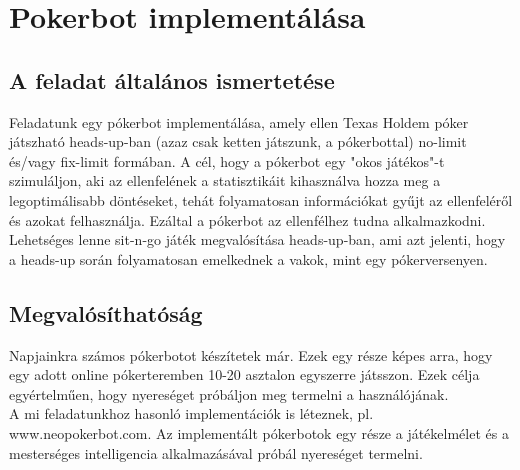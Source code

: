 \documentclass[a4paper]{article}
\begin{document}
\section*{Pokerbot implementálása}
\subsection*{A feladat általános ismertetése}
Feladatunk egy pókerbot implementálása, amely ellen Texas Holdem póker játszható heads-up-ban (azaz csak ketten játszunk, a pókerbottal) no-limit és/vagy fix-limit formában. A cél, hogy a pókerbot egy "okos játékos"-t szimuláljon, aki az ellenfelének a statisztikáit kihasználva hozza meg a legoptimálisabb döntéseket, tehát folyamatosan információkat gyűjt az ellenfeléről és azokat felhasználja. Ezáltal a pókerbot az ellenfélhez tudna alkalmazkodni.
Lehetséges lenne sit-n-go játék megvalósítása heads-up-ban, ami azt jelenti, hogy a heads-up során folyamatosan emelkednek a vakok, mint egy pókerversenyen.
\subsection*{Megvalósíthatóság}
Napjainkra számos pókerbotot készítetek már. Ezek egy része képes arra, hogy egy adott online pókerteremben 10-20 asztalon egyszerre játsszon. Ezek célja egyértelműen, hogy nyereséget próbáljon meg termelni a használójának.\\
A mi feladatunkhoz hasonló implementációk is léteznek, pl. www.neopokerbot.com.
Az implementált pókerbotok egy része a játékelmélet és a mesterséges intelligencia alkalmazásával próbál nyereséget termelni.
\end{document}
